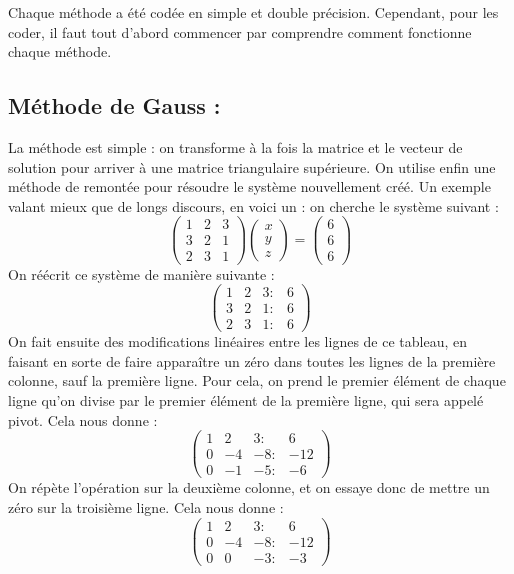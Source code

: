 \documentclass{article}
\theoremstyle{mes_theoremes}
\begin{document}
Chaque méthode a été codée en simple et double précision. Cependant, pour les coder, il faut tout d'abord commencer par comprendre comment fonctionne chaque méthode.
\textcolor{bleu}{\section*{Méthode de Gauss :}} 
La méthode est simple : on transforme à la fois la matrice et le vecteur de solution pour arriver à une matrice triangulaire supérieure. On utilise enfin une méthode de remontée pour résoudre le système nouvellement créé. Un exemple valant mieux que de longs discours, en voici un : on cherche le système suivant :
\[\left(\begin{matrix}
   1 & 2 & 3 \\
   3 & 2 & 1 \\
   2 & 3 & 1 \end{matrix}\right)
\left(\begin{matrix}
   x\\
   y\\
   z
\end{matrix}\right)
=
\left(\begin{matrix}
   6 \\
   6 \\
   6 
\end{matrix}\right)
\]
On réécrit ce système de manière suivante :
\[\left(\begin{matrix}
   1 & 2 & 3 :& 6 \\
   3 & 2 & 1 :& 6\\
   2 & 3 & 1 :& 6\end{matrix}\right)\]
On fait ensuite des modifications linéaires entre les lignes de ce tableau, en faisant en sorte de faire apparaître un zéro dans toutes les lignes de la première colonne, sauf la première ligne. Pour cela, on prend le premier élément de chaque ligne qu'on divise par le premier élément de la première ligne, qui sera appelé pivot. Cela nous donne : 
\[\left(\begin{matrix}
   1 & 2 & 3 :& 6 \\
   0 & -4 & -8 :& -12\\
   0 & -1 & -5 :& -6\end{matrix}\right)\]
On répète l'opération sur la deuxième colonne, et on essaye donc de mettre un zéro sur la troisième ligne. Cela nous donne :
\[\left(\begin{matrix}
   1 & 2 & 3 :& 6 \\
   0 & -4 & -8 :& -12\\
   0 & 0 & -3 :& -3\end{matrix}\right)\]
\end{document}

